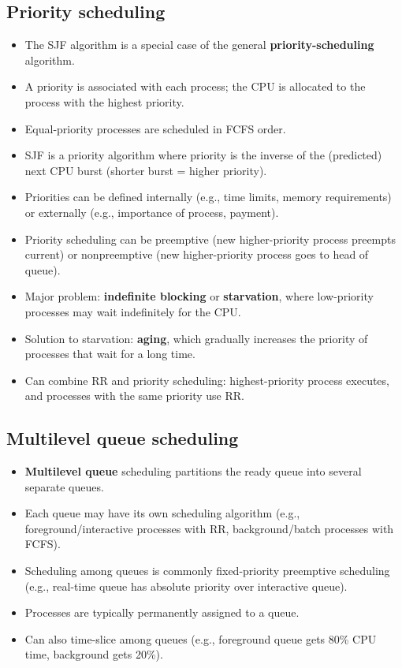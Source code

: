 \subsection{Priority scheduling}
\begin{itemize}
    \item The SJF algorithm is a special case of the general \textbf{priority-scheduling} algorithm.
    \item A priority is associated with each process; the CPU is allocated to the process with the highest priority.
    \item Equal-priority processes are scheduled in FCFS order.
    \item SJF is a priority algorithm where priority is the inverse of the (predicted) next CPU burst (shorter burst = higher priority).
    \item Priorities can be defined internally (e.g., time limits, memory requirements) or externally (e.g., importance of process, payment).
    \item Priority scheduling can be preemptive (new higher-priority process preempts current) or nonpreemptive (new higher-priority process goes to head of queue).
    \item Major problem: \textbf{indefinite blocking} or \textbf{starvation}, where low-priority processes may wait indefinitely for the CPU.
    \item Solution to starvation: \textbf{aging}, which gradually increases the priority of processes that wait for a long time.
    \item Can combine RR and priority scheduling: highest-priority process executes, and processes with the same priority use RR.
\end{itemize}

\subsection{Multilevel queue scheduling}
\begin{itemize}
    \item \textbf{Multilevel queue} scheduling partitions the ready queue into several separate queues.
    \item Each queue may have its own scheduling algorithm (e.g., foreground/interactive processes with RR, background/batch processes with FCFS).
    \item Scheduling among queues is commonly fixed-priority preemptive scheduling (e.g., real-time queue has absolute priority over interactive queue).
    \item Processes are typically permanently assigned to a queue.
    \item Can also time-slice among queues (e.g., foreground queue gets 80\% CPU time, background gets 20\%).
\end{itemize}

